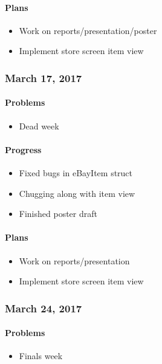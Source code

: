\paragraph{Plans}\label{plans}
\begin{itemize}
\tightlist
\item
  Work on reports/presentation/poster
\item
  Implement store screen item view
\end{itemize}

\subsubsection{March 17, 2017}\label{section}
\paragraph{Problems}\label{problems}
\begin{itemize}
\tightlist
\item
  Dead week
\end{itemize}
\paragraph{Progress}\label{progress}
\begin{itemize}
\tightlist
\item
  Fixed bugs in eBayItem struct
\item
  Chugging along with item view
\item
  Finished poster draft
\end{itemize}
\paragraph{Plans}\label{plans}
\begin{itemize}
\tightlist
\item
  Work on reports/presentation
\item
  Implement store screen item view
\end{itemize}

\subsubsection{March 24, 2017}\label{section}
\paragraph{Problems}\label{problems}
\begin{itemize}
\tightlist
\item
  Finals week
\end{itemize}
